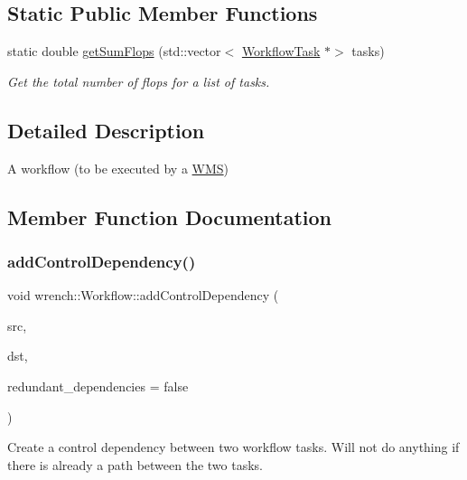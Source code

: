 \subsection*{Static Public Member Functions}
\begin{DoxyCompactItemize}
\item 
static double \hyperlink{classwrench_1_1_workflow_a2d6acb74faf1153f491bf7b52847ce82}{get\+Sum\+Flops} (std\+::vector$<$ \hyperlink{classwrench_1_1_workflow_task}{Workflow\+Task} $\ast$$>$ tasks)
\begin{DoxyCompactList}\small\item\em Get the total number of flops for a list of tasks. \end{DoxyCompactList}\end{DoxyCompactItemize}


\subsection{Detailed Description}
A workflow (to be executed by a \hyperlink{classwrench_1_1_w_m_s}{W\+MS}) 

\subsection{Member Function Documentation}
\mbox{\label{classwrench_1_1_workflow_a1249e2430c541344d622d75519e4851b}} 
\subsubsection{\texorpdfstring{add\+Control\+Dependency()}{addControlDependency()}}
{\footnotesize\ttfamily void wrench\+::\+Workflow\+::add\+Control\+Dependency (\begin{DoxyParamCaption}\item[{\hyperlink{classwrench_1_1_workflow_task}{Workflow\+Task} $\ast$}]{src,  }\item[{\hyperlink{classwrench_1_1_workflow_task}{Workflow\+Task} $\ast$}]{dst,  }\item[{bool}]{redundant\+\_\+dependencies = {\ttfamily false} }\end{DoxyParamCaption})}



Create a control dependency between two workflow tasks. Will not do anything if there is already a path between the two tasks. 


